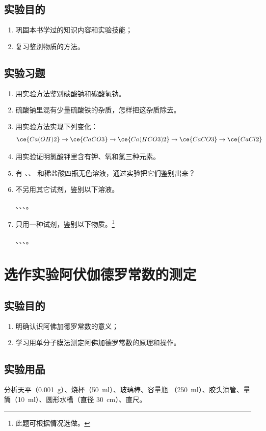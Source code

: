 \subsection*{实验目的}
\begin{enumerate}[1.]
  \item 巩固本书学过的知识内容和实验技能；
  \item 复习鉴别物质的方法。
\end{enumerate}
\subsection*{实验习题}
\begin{enumerate}[1.]
  \item 用实验方法鉴别碳酸钠和碳酸氢钠。
  \item 硫酸钠里混有少量硫酸铁的杂质，怎样把这杂质除去。
  \item 用实验方法实现下列变化：
  \[\ce{Ca(OH)2}\to\ce{CaCO3}\to\ce{Ca(HCO3)2}\to\ce{CaCO3}\to\ce{CaCl2}\]
  \item 用实验证明氯酸钾里含有钾、氧和氯三种元素。
  \item 有 、、 和稀盐酸四瓶无色溶液，通过实验把它们鉴别出来？
  \item 不另用其它试剂，鉴别以下溶液。\par {}、、、。
  \item 只用一种试剂，鉴别以下物质。\footnote{此题可根据情况选做。}\par {}、、、。
\end{enumerate}

\section*{选作实验\texorpdfstring{\quad}{ }阿伏伽德罗常数的测定}
\subsection*{实验目的}
\begin{enumerate}[1.]
  \item 明确认识阿佛加德罗常数的意义；
  \item 学习用单分子膜法测定阿佛加德罗常数的原理和操作。
\end{enumerate}
\subsection*{实验用品}
分析天平（\qty{0.001}{g}）、烧杯（\qty{50}{ml}）、玻璃棒、容量瓶 （\qty{250}{ml}）、胶头滴管、量筒（\qty{10}{ml}）、圆形水槽（直径 \qty{30}{cm}）、直尺。

